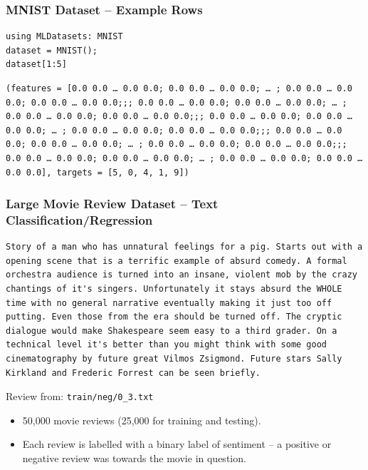 \documentclass[10pt]{beamer}
\begin{document}
\subsubsection*{MNIST Dataset -- Example Rows}
\label{sec:org6dfb264}

\begin{verbatim}
using MLDatasets: MNIST
dataset = MNIST();
dataset[1:5]
\end{verbatim}

\begin{verbatim}
(features = [0.0 0.0 … 0.0 0.0; 0.0 0.0 … 0.0 0.0; … ; 0.0 0.0 … 0.0 0.0; 0.0 0.0 … 0.0 0.0;;; 0.0 0.0 … 0.0 0.0; 0.0 0.0 … 0.0 0.0; … ; 0.0 0.0 … 0.0 0.0; 0.0 0.0 … 0.0 0.0;;; 0.0 0.0 … 0.0 0.0; 0.0 0.0 … 0.0 0.0; … ; 0.0 0.0 … 0.0 0.0; 0.0 0.0 … 0.0 0.0;;; 0.0 0.0 … 0.0 0.0; 0.0 0.0 … 0.0 0.0; … ; 0.0 0.0 … 0.0 0.0; 0.0 0.0 … 0.0 0.0;;; 0.0 0.0 … 0.0 0.0; 0.0 0.0 … 0.0 0.0; … ; 0.0 0.0 … 0.0 0.0; 0.0 0.0 … 0.0 0.0], targets = [5, 0, 4, 1, 9])
\end{verbatim}

\subsubsection*{Large Movie Review Dataset -- Text Classification/Regression}
\label{sec:orge40d6f6}

\begin{verbatim}
Story of a man who has unnatural feelings for a pig. Starts out with a
opening scene that is a terrific example of absurd comedy. A formal
orchestra audience is turned into an insane, violent mob by the crazy
chantings of it's singers. Unfortunately it stays absurd the WHOLE
time with no general narrative eventually making it just too off
putting. Even those from the era should be turned off. The cryptic
dialogue would make Shakespeare seem easy to a third grader. On a
technical level it's better than you might think with some good
cinematography by future great Vilmos Zsigmond. Future stars Sally
Kirkland and Frederic Forrest can be seen briefly.
\end{verbatim}

Review from: \texttt{train/neg/0\_3.txt}

\begin{itemize}
\item 50,000 movie reviews (25,000 for training and testing).
\item Each review is labelled with a binary label of sentiment -- a positive or negative
review was towards the movie in question.
\end{itemize}
\end{document}
